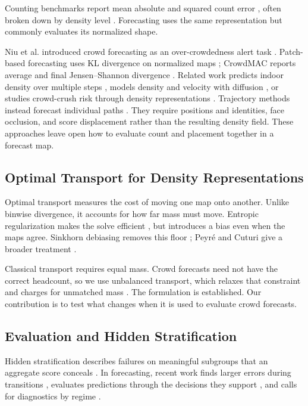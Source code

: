 \documentclass{article}
\begin{document}
Counting benchmarks report mean absolute and squared count error \cite{wang2020}, often broken down by density level \cite{wang2021}. Forecasting uses the same representation but commonly evaluates its normalized shape.

Niu et al. introduced crowd forecasting as an over-crowdedness alert task \cite{niu2020}. Patch-based forecasting uses KL divergence on normalized maps \cite{minoura2020}; CrowdMAC reports average and final Jensen--Shannon divergence \cite{fujii2025}. Related work predicts indoor density over multiple steps \cite{mscdp2023}, models density and velocity with diffusion \cite{morales2025}, or studies crowd-crush risk through density representations \cite{vtcrowdnet2026}. Trajectory methods instead forecast individual paths \cite{alahi2016social, gupta2018socialgan}. They require positions and identities, face occlusion, and score displacement rather than the resulting density field. These approaches leave open how to evaluate count and placement together in a forecast map.

\subsection{Optimal Transport for Density Representations}
\label{sec:related-ot}

Optimal transport measures the cost of moving one map onto another. Unlike binwise divergence, it accounts for how far mass must move. Entropic regularization makes the solve efficient \cite{cuturi2013}, but introduces a bias even when the maps agree. Sinkhorn debiasing removes this floor \cite{feydy2019}; Peyr\'e and Cuturi give a broader treatment \cite{peyre2019}.

Classical transport requires equal mass. Crowd forecasts need not have the correct headcount, so we use unbalanced transport, which relaxes that constraint and charges for unmatched mass \cite{chizat2018}. The formulation is established. Our contribution is to test what changes when it is used to evaluate crowd forecasts.

\subsection{Evaluation and Hidden Stratification}
\label{sec:related-evaluation}

Hidden stratification describes failures on meaningful subgroups that an aggregate score conceals \cite{oakden2020}. In forecasting, recent work finds larger errors during transitions \cite{wang2026}, evaluates predictions through the decisions they support \cite{namazi2026}, and calls for diagnostics by regime \cite{phungtua2026}.
\end{document}
